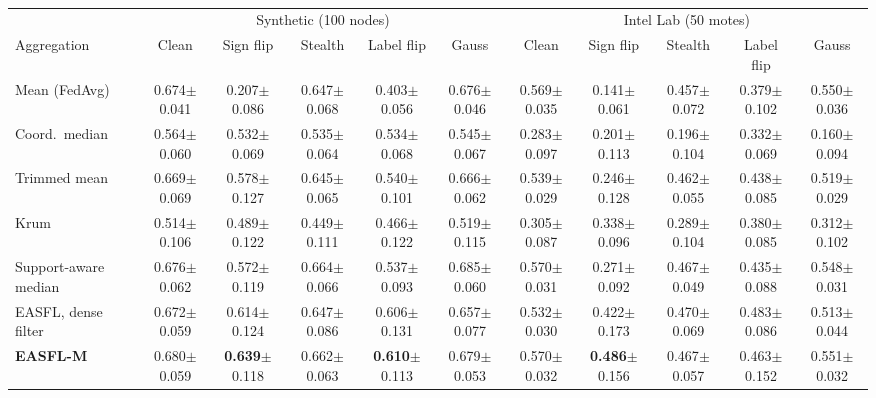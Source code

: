 \documentclass[journal]{IEEEtran}
\newcommand{\pms}[2]{#1{\tiny$\pm$#2}}
\begin{document}
\begin{table}[t]
\caption{}\label{tab:matched}
\centering\scriptsize\setlength{\tabcolsep}{2.6pt}
\begin{tabular}{@{}lccccc|ccccc@{}}
\toprule
 & \multicolumn{5}{c|}{Synthetic (100 nodes)} & \multicolumn{5}{c}{Intel Lab (50 motes)}\\
Aggregation & Clean & Sign flip & Stealth & Label flip & Gauss & Clean & Sign flip & Stealth & Label flip & Gauss\\
\midrule
Mean (FedAvg) & \pms{0.674}{0.041} & \pms{0.207}{0.086} & \pms{0.647}{0.068} & \pms{0.403}{0.056} & \pms{0.676}{0.046} & \pms{0.569}{0.035} & \pms{0.141}{0.061} & \pms{0.457}{0.072} & \pms{0.379}{0.102} & \pms{0.550}{0.036}\\
Coord.\ median & \pms{0.564}{0.060} & \pms{0.532}{0.069} & \pms{0.535}{0.064} & \pms{0.534}{0.068} & \pms{0.545}{0.067} & \pms{0.283}{0.097} & \pms{0.201}{0.113} & \pms{0.196}{0.104} & \pms{0.332}{0.069} & \pms{0.160}{0.094}\\
Trimmed mean & \pms{0.669}{0.069} & \pms{0.578}{0.127} & \pms{0.645}{0.065} & \pms{0.540}{0.101} & \pms{0.666}{0.062} & \pms{0.539}{0.029} & \pms{0.246}{0.128} & \pms{0.462}{0.055} & \pms{0.438}{0.085} & \pms{0.519}{0.029}\\
Krum & \pms{0.514}{0.106} & \pms{0.489}{0.122} & \pms{0.449}{0.111} & \pms{0.466}{0.122} & \pms{0.519}{0.115} & \pms{0.305}{0.087} & \pms{0.338}{0.096} & \pms{0.289}{0.104} & \pms{0.380}{0.085} & \pms{0.312}{0.102}\\
Support-aware median & \pms{0.676}{0.062} & \pms{0.572}{0.119} & \pms{0.664}{0.066} & \pms{0.537}{0.093} & \pms{0.685}{0.060} & \pms{0.570}{0.031} & \pms{0.271}{0.092} & \pms{0.467}{0.049} & \pms{0.435}{0.088} & \pms{0.548}{0.031}\\
EASFL, dense filter & \pms{0.672}{0.059} & \pms{0.614}{0.124} & \pms{0.647}{0.086} & \pms{0.606}{0.131} & \pms{0.657}{0.077} & \pms{0.532}{0.030} & \pms{0.422}{0.173} & \pms{0.470}{0.069} & \pms{0.483}{0.086} & \pms{0.513}{0.044}\\
\textbf{EASFL-M} & \pms{0.680}{0.059} & \pms{\textbf{0.639}}{0.118} & \pms{0.662}{0.063} & \pms{\textbf{0.610}}{0.113} & \pms{0.679}{0.053} & \pms{0.570}{0.032} & \pms{\textbf{0.486}}{0.156} & \pms{0.467}{0.057} & \pms{0.463}{0.152} & \pms{0.551}{0.032}\\
\bottomrule
\end{tabular}
\end{table}
\end{document}
